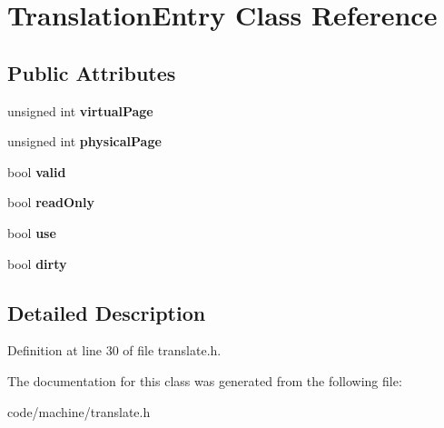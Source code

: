 \section{Translation\+Entry Class Reference}
\label{class_translation_entry}
\subsection*{Public Attributes}
\begin{DoxyCompactItemize}
\item 
unsigned int {\bfseries virtual\+Page}\label{class_translation_entry_af7d48c86a1188e1e78f00d3eaa1b21ad}

\item 
unsigned int {\bfseries physical\+Page}\label{class_translation_entry_ada1901a6079061755592c3b5d6a4098c}

\item 
bool {\bfseries valid}\label{class_translation_entry_a655ccdb71f2e1c8bc43d751b5c375cd2}

\item 
bool {\bfseries read\+Only}\label{class_translation_entry_a99d5c440c0d011213a39edf4d0844a7d}

\item 
bool {\bfseries use}\label{class_translation_entry_acd4ec2f9980de42c849562c211a3813a}

\item 
bool {\bfseries dirty}\label{class_translation_entry_a4a198eb7773a247967dcf4e377d3717f}

\end{DoxyCompactItemize}


\subsection{Detailed Description}


Definition at line 30 of file translate.\+h.



The documentation for this class was generated from the following file\+:\begin{DoxyCompactItemize}
\item 
code/machine/translate.\+h\end{DoxyCompactItemize}
